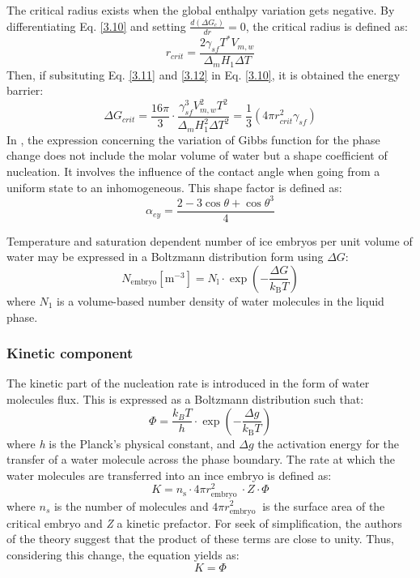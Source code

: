 The critical radius exists when the global enthalpy variation gets negative.
\newline
By differentiating Eq. \ref{3.10} and setting $\frac{d(\Delta G_c)}{dr} = 0$, the critical radius is defined as:
\begin{equation}
\label{3.12}
r_{c r i t}=\frac{2 \gamma_{s f} T^{*} V_{m, w}}{\Delta_{m} H_{1} \Delta T}
\end{equation}
Then, if subsituting Eq. \ref{3.11} and \ref{3.12} in Eq. \ref{3.10}, it is obtained the energy barrier:
\begin{equation}
\label{3.13}
\Delta G_{c r i t}=\frac{16 \pi}{3} \cdot \frac{\gamma_{s f}^{3} V_{m, w}^{2} T^{2}}{\Delta_{m} H_{1}^{2} \Delta T^{2}}=\frac{1}{3}\left(4 \pi r_{c r i t}^{2} \gamma_{s f}\right)
\end{equation}
In \cite{huang_wang_li_2020}, the expression concerning the variation of Gibbs function for the phase change does not include the molar volume of water but a shape coefficient of nucleation. It involves the influence of the contact angle when going from a uniform state to an inhomogeneous. This shape factor is defined as:
\begin{equation}
\label{3.13a}
\alpha_{e y}=\frac{2-3 \cos \theta+\cos \theta^{3}}{4}
\end{equation}

Temperature and saturation dependent number of ice embryos per unit volume of water may be expressed in a Boltzmann distribution form using $\Delta G$:
\begin{equation}
\label{3.14}
N_{\mathrm{embryo}}\left[\mathrm{m}^{-3}\right]=N_{\mathrm{l}} \cdot \exp \left(-\frac{\Delta G}{k_{\mathrm{B}} T}\right)
\end{equation}
where $N_{1}$ is a volume-based number density of water molecules in the liquid phase.
\subsubsection*{Kinetic component}
The kinetic part of the nucleation rate is introduced in the form of water molecules flux. This is expressed as a Boltzmann distribution such that:
\begin{equation}
\label{3.15}
\Phi=\frac{k_{B} T}{h} \cdot \exp \left(-\frac{\Delta g}{k_{\mathrm{B}} T}\right)
\end{equation}
where \textit{h} is the Planck's physical constant, and $\Delta g$ the activation energy for the transfer of a water molecule across the phase boundary.
\newline
The rate at which the water molecules are transferred into an ince embryo is defined as:
\begin{equation}
\label{3.16}
K=n_{\mathrm{s}} \cdot 4 \pi r_{\text {embryo }}^{2} \cdot Z \cdot \Phi
\end{equation}
where $n_s$ is the number of molecules and $4 \pi r_{\text {embryo }}^{2}$ is the surface area of the critical embryo and \textit{Z} a kinetic prefactor. For seek of simplification, the authors of the theory suggest that the product of these terms are close to unity. Thus, considering this change, the equation yields as:
\begin{equation}
\label{3.17}
K=\Phi
\end{equation}
